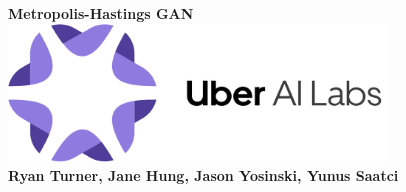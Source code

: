 \documentclass[a0,landscape]{a0poster}
\begin{document}


\begin{centering}{\fontsize{100}{120} \selectfont \color{NavyBlue} \textbf{Metropolis-Hastings GAN} \color{Black}}\\ %
\includegraphics[width=10cm]{uber_ai_logo_bootleg.pdf} \\ %
\Huge \textbf{Ryan Turner, Jane Hung, Jason Yosinski, Yunus Saatci}\\ %
\end{centering}
%

%

\end{document}
